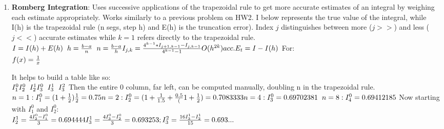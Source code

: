\documentclass[fontsize=5pt]{scrartcl}
\begin{document}
\begin{multicols}{3}
\begin{enumerate}
      \item \textbf{Romberg Integration}: Uses successive applications of the trapezoidal rule to get more accurate
        estimates of an integral by weighing each estimate appropriately. Works similarly to a previous problem on 
        HW2. I below represents the true value of the integral, while I(h) is the trapezoidal rule (n segs, step h)
        and E(h) is the truncation error). Index $j$ distinguishes between more ($j>>$) and less ($j<<$) accurate 
        estimates while $k=1$ refers directly to the trapezoidal rule.\\
        \begin{math}
          I=I(h)+E(h) \hspace{2mm} h=\frac{b-a}{n} \hspace{2mm} n=\frac{b-a}{h} \\
          I_{j,k}=\frac{4^{k-1}*I_{j+1,k-1} - I_{j,k-1}}{4^{k-1}-1} \\
          O(h^{2k}) acc. \\
          E_t=I-I(h) \\
         \end{math} 
         For:\\
         \begin{math}
           f(x) = \frac{1}{x} \\
         \end{math}

         It helps to build a table like so: \\
         \begin{math}
           I^0_1 \\
           I^0_2\hspace{2mm}I^1_2 \\
           I^0_3\hspace{2mm}I^1_3\hspace{2mm}I^2_3 \\
         \end{math}
         Then the entire 0 column, far left, can be computed manually, doubling n in the trapezoidal rule. \\
         \begin{math}
           n=1: I^0_1 = (1+\frac{1}{2})\frac{1}{2} = 0.75 \\
           n=2: I^0_2 = (1+\frac{1}{1.5}+\frac{0.5}(1+\frac{1}{2})=0.7083333\\
           n=4: I^0_3 = 0.69702381 \hspace{2mm}%
           n=8: I^0_4 = 0.69412185 \\
         \end{math}
         Now starting with $I^0_1$ and $I^0_2$: \\
         \begin{math}
           I^1_2=\frac{4I^0_2-I^0_1}{3} = 0.694444 \\
           I^1_3=\frac{4I^0_3-I^0_2}{3}=0.693253;\vspace{2mm} I^2_3=\frac{16I^1_3-I^1_2}{15}=0.693... \\
         \end{math}


\end{enumerate}
\end{multicols}
\end{document}
